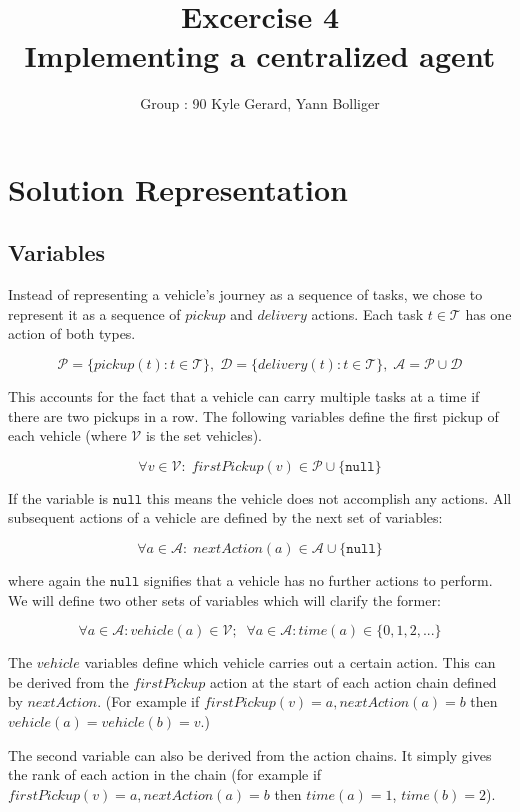 \documentclass[11pt]{article}
\title{\bf Excercise 4\\ Implementing a centralized agent}
\author{Group \textnumero : 90  Kyle Gerard, Yann Bolliger}
\begin{document}
\maketitle

\section{Solution Representation}

\subsection{Variables} 

Instead of representing a vehicle's journey as a sequence of tasks, we chose to
represent it as a sequence of $pickup$ and $delivery$ actions. Each task 
$t \in \mathcal{T}$
has one action of both types.

$$
\mathcal{P} = \{pickup(t) : t \in \mathcal{T}\} , \;  
\mathcal{D} = \{delivery(t) : t \in \mathcal{T}\} , \; 
\mathcal{A} =  \mathcal{P} \cup \mathcal{D}
$$

This accounts for the fact that a vehicle can carry multiple tasks at a time if
there are two pickups in a row. The following variables define the 
first pickup of each vehicle (where $\mathcal{V}$ is the set vehicles). 

$$
\forall v \in \mathcal{V}  : \;
firstPickup(v)  \in \mathcal{P} \cup \{\mathtt{null}\} 
$$

If the variable is $\mathtt{null}$ this means the vehicle does not accomplish
any actions. All subsequent actions of a vehicle are defined by the next set of
variables:

$$
\forall a \in \mathcal{A}  : \;
nextAction(a) \in \mathcal{A}  \cup \{\mathtt{null}\} 
$$

where again the $\mathtt{null}$ signifies that a vehicle has no further actions
to perform. We will define two other sets of variables which will clarify the
former:

$$
\forall a \in \mathcal{A}  :
vehicle(a) \in \mathcal{V};
\;\;
\forall a \in \mathcal{A}  :
time(a) \in \{0, 1, 2, ...\}
$$

The $vehicle$ variables define which vehicle carries out a certain action.
This can be derived from the $firstPickup$ action at the start of
each action chain defined by $nextAction$. (For example if
$firstPickup(v) = a, nextAction(a) = b$ then 
$vehicle(a) = vehicle(b) = v$.)

The second variable can also be 
derived from the action chains. It simply gives the rank of each action
in the chain (for example if 
$firstPickup(v) = a, nextAction(a) = b$ then $time(a) = 1$, $time(b) = 2$).
\end{document}
